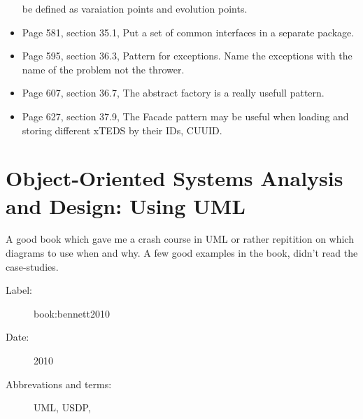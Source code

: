 \begin{itemize}
        be defined as varaiation points and evolution points.
    \item Page 581, section 35.1, Put a set of common interfaces in a separate
        package.
    \item Page 595, section 36.3, Pattern for exceptions. Name the exceptions
        with the name of the problem not the thrower.
    \item Page 607, section 36.7, The abstract factory is a really usefull
        pattern.
    \item Page 627, section 37.9, The Facade pattern may be useful when loading
        and storing different xTEDS by their IDs, CUUID.
\end{itemize}

\section{Object-Oriented Systems Analysis and Design: Using UML}
A good book which gave me a crash course in UML or rather repitition on which
diagrams to use when and why. A few good examples in the book, didn't read the
case-studies.

\begin{description}
    \item[Label:] book:bennett2010 \cite{book:bennett2010}
    \item[Date:] 2010
    \item[Abbrevations and terms:]
        UML,
        USDP,
\end{description}



